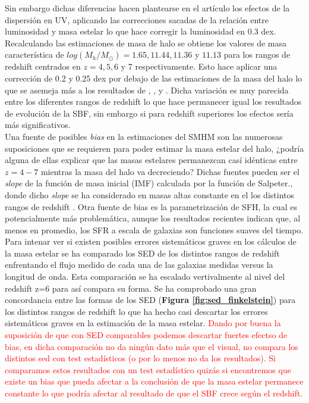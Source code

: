 \documentclass{article}
\begin{document}
Sin embargo dichas diferencias hacen plantearse en el artículo los efectos de la dispersión en UV, aplicando las correcciones sacadas de la relación entre luminosidad y masa estelar lo que hace corregir la luminosidad en 0.3 dex. Recalculando las estimaciones de masa de halo se obtiene los valores de masa característica de $log(M_h/M_\odot)=1.65, 11.44, 11.36$ y $11.13$ para los rangos de redshift centrados en $z=4,5,6$ y 7 respectivamente. Esto hace aplicar una corrección de 0.2 y 0.25 dex por debajo de las estimaciones de la masa del halo lo que se asemeja más a los resultados de \cite{behroozi2013average}, \cite{barone2014measurement}, \cite{lee2006large} y \cite{overzier2006clustering}. Dicha variación es muy parecida entre los diferentes rangos de redshift lo que hace permanecer igual los resultados de evolución de la SBF, sin embargo si para redshift superiores los efectos sería más significativos.\\

Una fuente de posibles \textit{bias} en la estimaciones del SMHM son las numerosas suposiciones que se requieren para poder estimar la masa estelar del halo, ¿podría alguna de ellas explicar que las masas estelares permanezcan casí idénticas entre $z=4-7$ mientras la masa del halo va decreciendo? Dichas fuentes pueden ser el \textit{slope} de la función de masa inicial (IMF) calculada por la función de Salpeter., donde dicho \textit{slope} se ha considerado en masas altas constante en el los distintos rangos de redshift . Otra fuente de bias es la parametrización de SFH, la cual es potencialmente más problemática, aunque los resultados recientes indican que, al menos en promedio, los SFR a escala de galaxias son funciones suaves del tiempo. Para intenar ver si existen posibles errores sistemáticos graves en los cálculos de la masa estelar se ha comparado  los SED de los distintos rangos de redshift enfrentando el flujo medido de cada una de las galaxias medidas versus la longitud de onda. Esta comparación se ha escalado vertivalmente al nivel del redshift z=6 para así compara su forma. Se ha comprobado una gran concordancia entre las formas de los SED (\textbf{Figura \ref{fig:sed_finkelstein}}) para los distintos rangos de redshift lo que ha hecho casi descartar los errores sistemáticos graves en la estimación de la masa estelar. \textcolor{red}{Dando por buena la suposición de que con SED comparables podemos descartar fuertes efectso de bias, en dicha comparación no da ningún dato más que el visual, no compara los distintos sed con test estadísticos (o por lo menos no da los resultados). Si comparamos estos resultados con un test estadístico quizás si encontremos que existe un bias que pueda afectar a la conclusión de que la masa estelar permanece constante lo que podría afectar al resultado de que el SBF crece según el redshift.}\\
\end{document}
